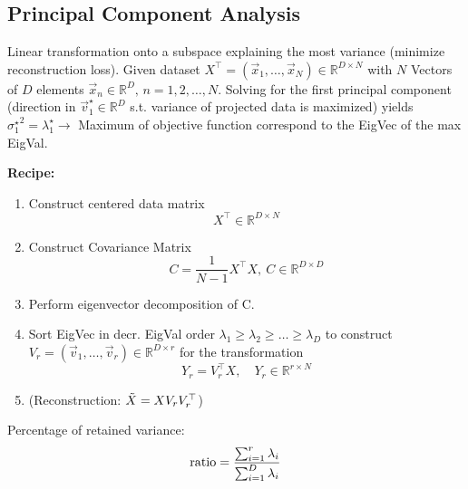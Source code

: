 \subsection{Principal Component Analysis}
    Linear transformation onto a subspace explaining the most variance (minimize reconstruction loss). Given dataset $X^\top = (\Vec{x}_1,\dots,\Vec{x}_N)\in\mathbb{R}^{D\times N}$ with $N$ Vectors of $D$ elements $\Vec{x}_n\in\mathbb{R}^D,\, n = 1,2,\dots,N$. %
    Solving for the first principal component (direction in $\Vec{v}_1^\star\in\mathbb{R}^D$ s.t. variance of projected data is maximized) yields ${\sigma_1^\star}^2 = \lambda_1^\star \rightarrow$ Maximum of objective function correspond to the EigVec of the max EigVal.
    
    \textbf{Recipe:}
    \begin{enumerate}
        \item Construct centered data matrix
            \begin{equation*}
                X^\top\in\mathbb{R}^{D\times N}
            \end{equation*}
            
        \item Construct Covariance Matrix 
            \begin{equation*}
                C = \frac{1}{N-1}X^\top X,\ C\in\mathbb{R}^{D\times D}
            \end{equation*}
        
        \item Perform eigenvector decomposition of C.
        \item Sort EigVec in decr. EigVal order $\lambda_1\geq\lambda_2\geq\dots\geq\lambda_D$ to construct $V_r = (\Vec{v}_1,\dots,\Vec{v}_r)\in\mathbb{R}^{D\times r}$ for the transformation 
        \begin{equation*}
        Y_r = V_r^\top X, \quad Y_r \in\mathbb{R}^{r\times N}
        \end{equation*}
        
        \item \Big(Reconstruction: $\Tilde{X} = X V_r V_r^\top$\Big)
        
    \end{enumerate}
    
    Percentage of retained variance:
    \begin{equation*}
        \textnormal{ratio} = \frac{\sum_{i=1}^r \lambda_i}{\sum_{i=1}^D \lambda_i}
    \end{equation*}